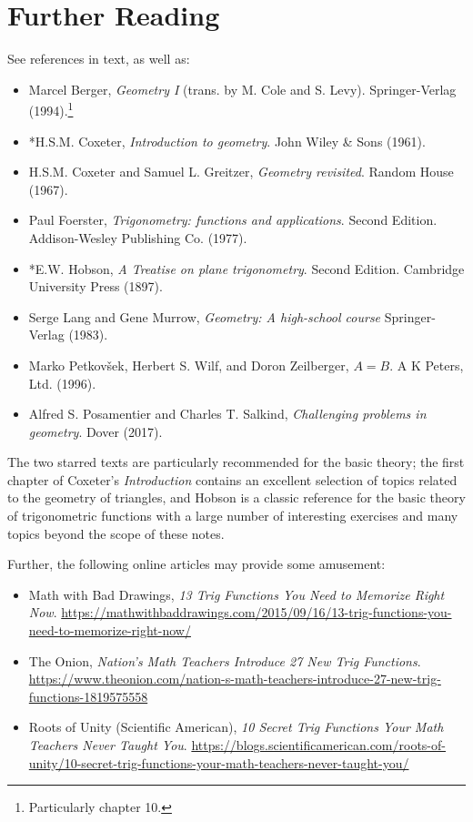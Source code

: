 \documentclass[a4paper,leqno]{article}
\numberwithin{equation}{section}
\theoremstyle{definition}
\theoremstyle{remark}
\begin{document}
\section*{Further Reading}
See references in text, as well as:
\begin{itemize}
  \item Marcel Berger, \emph{Geometry I} (trans. by M. Cole and S. Levy). Springer-Verlag (1994).\footnote{Particularly chapter 10.}
  \item *H.S.M. Coxeter, \emph{Introduction to geometry}. John Wiley \& Sons (1961).
  \item H.S.M. Coxeter and Samuel L. Greitzer, \emph{Geometry revisited}. Random House (1967).
  \item Paul Foerster, \emph{Trigonometry: functions and applications}. Second Edition. Addison-Wesley Publishing Co. (1977).
  \item *E.W. Hobson, \emph{A Treatise on plane trigonometry}. Second Edition. Cambridge University Press (1897).
  \item Serge Lang and Gene Murrow, \emph{Geometry: A high-school course} Springer-Verlag (1983).
  \item Marko Petkov\v sek, Herbert S. Wilf, and Doron Zeilberger, \emph{$A = B$}. A K Peters, Ltd. (1996).
  \item Alfred S. Posamentier and Charles T. Salkind, \emph{Challenging problems in geometry}. Dover (2017).
\end{itemize}
The two starred texts are particularly recommended for the basic theory; the first chapter of Coxeter's \emph{Introduction} contains an excellent
selection of topics related to the geometry of triangles, and Hobson is a classic reference for the basic theory of trigonometric functions with a
large number of interesting exercises and many topics beyond the scope of these notes.

Further, the following online articles may provide some amusement:
\begin{itemize}
  \item Math with Bad Drawings, \emph{13 Trig Functions You Need to Memorize Right Now}. \url{https://mathwithbaddrawings.com/2015/09/16/13-trig-functions-you-need-to-memorize-right-now/}
  \item The Onion, \emph{Nation's Math Teachers Introduce 27 New Trig Functions}. \url{https://www.theonion.com/nation-s-math-teachers-introduce-27-new-trig-functions-1819575558}
  \item Roots of Unity (Scientific American), \emph{10 Secret Trig Functions Your Math Teachers Never Taught You}. \url{https://blogs.scientificamerican.com/roots-of-unity/10-secret-trig-functions-your-math-teachers-never-taught-you/}
\end{itemize}
\end{document}
